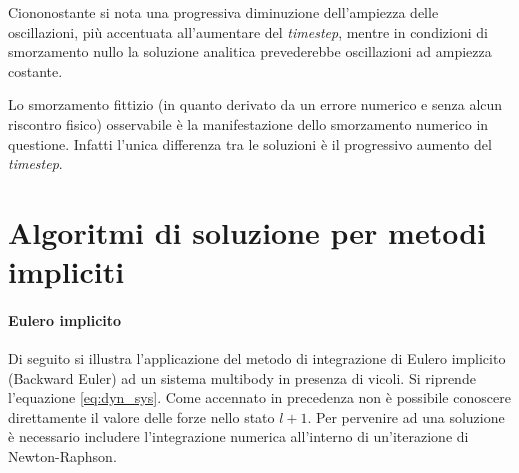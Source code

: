 Ciononostante si nota una progressiva diminuzione dell'ampiezza delle oscillazioni, più accentuata all'aumentare del \textit{timestep}, mentre in condizioni di smorzamento nullo la soluzione analitica prevederebbe oscillazioni ad ampiezza costante. 

Lo smorzamento fittizio (in quanto derivato da un errore numerico e senza alcun riscontro fisico) osservabile è la manifestazione dello smorzamento numerico in questione. Infatti l'unica differenza tra le soluzioni è il progressivo aumento del \textit{timestep}.


\section{Algoritmi di soluzione per metodi impliciti}
\paragraph{Eulero implicito}
Di seguito si illustra l'applicazione del metodo di integrazione di Eulero implicito (Backward Euler) ad un sistema multibody in presenza di vicoli.
Si riprende l'equazione \ref{eq:dyn_sys}. Come accennato in precedenza non è possibile conoscere direttamente il valore delle forze nello stato $l+1$. Per pervenire ad una soluzione è necessario includere l'integrazione numerica all'interno di un'iterazione di Newton-Raphson.

